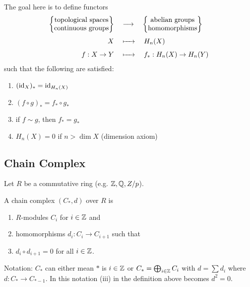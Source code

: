 \documentclass[a4paper,11pt]{article}
\begin{document}
		The goal here is to define functors
		\begin{align*}
			\begin{Bmatrix}
				\text{topological spaces}\\ \text{continuous groups}
			\end{Bmatrix}
			\quad&\longrightarrow \quad
			\begin{Bmatrix}
				\text{abelian groups}\\\text{homomorphisms}
			\end{Bmatrix}\\
			X\quad&\xmapsto{\phantom{kkl}}\quad H_{n}(X)\\
			f:X\rightarrow Y\quad&\xmapsto{\phantom{kkl}}\quad f_{\ast}:H_{n}(X)\rightarrow H_{n}(Y)
		\end{align*}
		such that the following are satisfied:
		\begin{enumerate}
			\item $(\operatorname{id}_{X})_{\ast}=\operatorname{id}_{H_{n}(X)}$
			\item $(f \circ g)_{\ast}=f_{\ast}\circ g_{\ast}$
			\item if $f\sim g$, then $f_{\ast}=g_{\ast}$
			\item $H_n(X)=0$ if $n>\dim X$ (dimension axiom)	
		\end{enumerate}


		\subsection{Chain Complex}
			Let $R$ be a commutative ring (e.g. $\mathbb{Z},\mathbb{Q},Z/p$).

			\begin{defi}
				A chain complex $(C_\ast,d)$ over $R$ is
				\begin{enumerate}
					\item $R$-modules $C_i$ for $i\in\mathbb{Z}$ and
					\item homomorphisms $d_i:C_i \rightarrow C_{i+1}$ such that
					\item $d_i \circ d_{i+1}=0$ for all $i\in\mathbb{Z}$.
				\end{enumerate}
			\end{defi}
			Notation: $C_\ast$ can either mean $\ast$ is $i\in\mathbb{Z}$ or $C_\ast=\bigoplus_{i\in\mathbb{Z}}C_i$ with $d=\sum d_i$ where $d:C_\ast \rightarrow C_{\ast -1}$. In this notation (iii) in the definition above becomes $d^2=0$.
\end{document}
